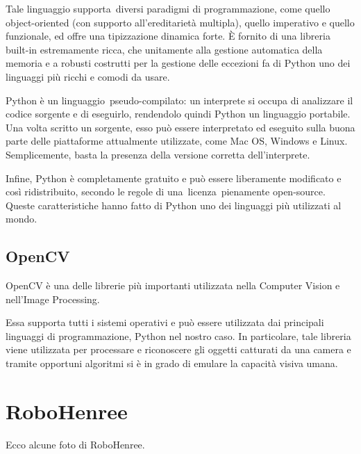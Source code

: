 \documentclass[a4paper,12pt,italian]{article}
\begin{document}
Tale linguaggio supporta diversi paradigmi di programmazione, come quello object-oriented (con supporto all'ereditarietà multipla), quello imperativo e quello funzionale, ed offre una tipizzazione dinamica forte. È fornito di una libreria built-in estremamente ricca, che unitamente alla gestione automatica della memoria e a robusti costrutti per la gestione delle eccezioni fa di Python uno dei linguaggi più ricchi e comodi da usare. 

Python è un linguaggio pseudo-compilato: un interprete si occupa di analizzare il codice sorgente e di eseguirlo, rendendolo quindi Python un linguaggio portabile. Una volta scritto un sorgente, esso può essere interpretato ed eseguito sulla buona parte delle piattaforme attualmente utilizzate, come Mac OS, Windows e Linux.  Semplicemente, basta la presenza della versione corretta dell'interprete. 

Infine, Python è completamente gratuito e può essere liberamente modificato e così ridistribuito, secondo le regole di una licenza pienamente open-source. Queste caratteristiche hanno fatto di Python uno dei linguaggi più utilizzati al mondo. 

\subsection{OpenCV}
OpenCV è una delle librerie più importanti utilizzata nella Computer Vision e nell’Image Processing.

Essa supporta tutti i sistemi operativi e può essere utilizzata dai principali linguaggi di programmazione, Python nel nostro caso. In particolare, tale libreria viene utilizzata per processare e riconoscere gli oggetti catturati da una camera e tramite opportuni algoritmi si è in grado di emulare la capacità visiva umana.

\section{RoboHenree}

Ecco alcune foto di RoboHenree.
\end{document}
